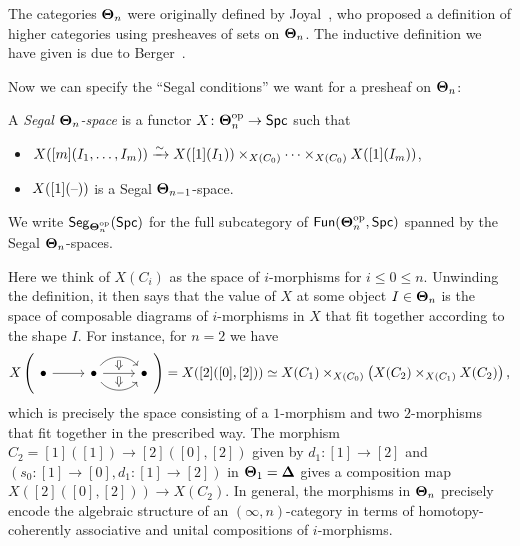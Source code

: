 \documentclass[a4paper,11pt]{article}
\begin{document}
\begin{remark}
  The categories $\boldsymbol{\Theta}_{n}$ were originally defined by
  Joyal~\cite{JoyalTheta}, who proposed a definition of higher
  categories using presheaves of sets on $\boldsymbol{\Theta}_{n}$. The inductive
  definition we have given is due to Berger~\cite{BergerWreath}.
\end{remark}

Now we can specify the ``Segal conditions'' we want for a presheaf on $\boldsymbol{\Theta}_{n}$:
\begin{defn}
  A \emph{Segal $\boldsymbol{\Theta}_{n}$-space} is a functor $X \colon \bT_{n}^{\op}
  \to \Spc$  such that
  \begin{itemize}
  \item $X([m](I_{1},\ldots,I_{m})) \isoto X([1](I_{1}))\times_{X(C_{0})}
    \cdots \times_{X(C_{0})} X([1](I_{m}))$,
  \item $X([1](\text{\textendash}))$ is a Segal $\boldsymbol{\Theta}_{n-1}$-space.
  \end{itemize}
  We write $\textup{\textsf{Seg}}_{\boldsymbol{\Theta}_{n}^{\text{\textup{op}}}}(\textup{\textsf{Spc}})$ for the full subcategory of
  $\textup{\textsf{Fun}}(\boldsymbol{\Theta}_{n}^{\text{\textup{op}}}, \textup{\textsf{Spc}})$ spanned by the Segal $\boldsymbol{\Theta}_{n}$-spaces.
\end{defn}

\begin{remark}
Here we think of $X(C_{i})$ as the space of $i$-morphisms for $i \leq
0 \leq n$. Unwinding the definition, it then says that the value of
$X$ at some object $I \in \boldsymbol{\Theta}_{n}$ is the space of composable diagrams
of $i$-morphisms in $X$ that fit together according to the shape
$I$. For instance, for $n = 2$ we have
\[ X\left(
  \begin{tikzcd}
  \bullet 
  \ar[r]  &
  \bullet 
  \ar[r, bend left=50, ""{below,name=G,inner sep=1pt}] 
  \ar[r, ""{name=H1,inner sep=1pt}, ""{name=H2,below,inner sep=1pt}] 
  \ar[r, bend right=50, ""{name=I,inner sep=1pt}] &
  \bullet
  \arrow[from=G,to=H1,Rightarrow]
  \arrow[from=H2,to=I,Rightarrow]
  \end{tikzcd}
\right) = X([2]([0],[2])) \simeq X(C_{1}) \times_{X(C_{0})}
\left(X(C_{2}) \times_{X(C_{1})} X(C_{2})\right),\] which is precisely
the space consisting of a $1$-morphism and two $2$-morphisms that fit
together in the prescribed way. The morphism $C_{2}= [1]([1]) \to
[2]([0],[2])$ given by $d_{1} \colon [1] \to [2]$ and $(s_{0} \colon
[1] \to [0], d_{1} \colon [1] \to [2])$ in $\boldsymbol{\Theta}_{1} = \boldsymbol{\Delta}$ gives a
composition map $X([2]([0],[2])) \to X(C_{2})$. In general, the
morphisms in $\boldsymbol{\Theta}_{n}$ precisely encode the algebraic structure of an
$(\infty,n)$-category in terms of homotopy-coherently associative and
unital compositions of $i$-morphisms.
\end{remark}
\end{document}
